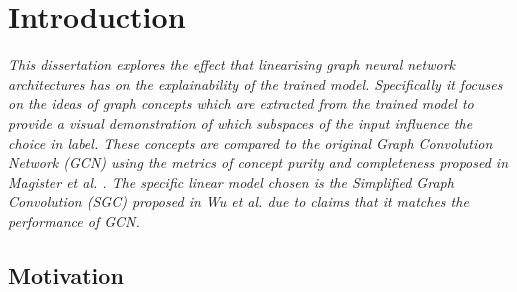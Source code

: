 \chapter{Introduction}


\emph{
This dissertation explores the effect that linearising graph neural network architectures has on the explainability of the trained model.
Specifically it focuses on the ideas of graph concepts which are extracted from the trained model to provide a visual demonstration of which subspaces of the input influence the choice in label.
These concepts are compared to the original Graph Convolution Network (GCN) using the metrics of concept purity and completeness proposed in \textit{Magister et al.} \cite{magister2021gcexplainer}.
The specific linear model chosen is the Simplified Graph Convolution (SGC) proposed in \textit{Wu et al.} \cite{wu2019simplifying} due to claims that it matches the performance of GCN.
}

\section{Motivation}
\label{sec:motivation}




